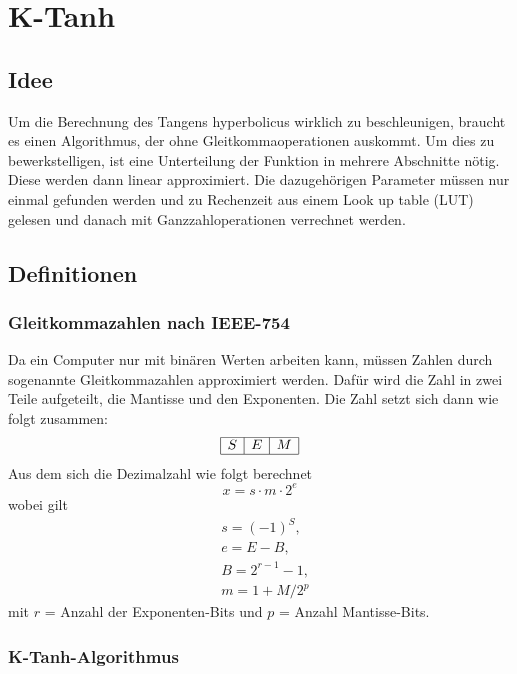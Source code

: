%
%
%
\section{K-Tanh
\label{transfer:section:teil4}}

\subsection{Idee
	\label{transfer:subsection:Ktanh-Idee}}
Um die Berechnung des Tangens hyperbolicus wirklich zu beschleunigen, braucht es einen Algorithmus, der ohne Gleitkommaoperationen auskommt. Um dies zu bewerkstelligen, ist eine Unterteilung der Funktion in mehrere Abschnitte nötig. Diese werden dann linear approximiert. Die dazugehörigen Parameter müssen nur einmal gefunden werden und zu Rechenzeit aus einem Look up table (LUT) gelesen und danach mit Ganzzahloperationen verrechnet werden.


\subsection{Definitionen
	\label{transfer:subsection:Ktanh-Definition}}

\subsubsection{Gleitkommazahlen nach IEEE-754
	\label{transfer:subsection:Ktanh-Algorithmus:Gleitkommazahl}}
Da ein Computer nur mit binären Werten arbeiten kann, müssen Zahlen durch sogenannte Gleitkommazahlen approximiert werden. Dafür wird die Zahl in zwei Teile aufgeteilt, die Mantisse und den Exponenten. Die Zahl setzt sich dann wie folgt zusammen:
$$
\begin{array}{|l|l|l|}
	\hline S & E & M \\
	\hline
\end{array}
$$
Aus dem sich die Dezimalzahl wie folgt berechnet
$$
x=s \cdot m \cdot 2^{e}
$$
wobei gilt
$$
\begin{aligned}
	&s=(-1)^{S}, \\
	&e=E-B,\\
	&B=2^{r-1}-1,\\
	&m=1+M / 2^{p}
\end{aligned}
$$
mit $r$ = Anzahl der Exponenten-Bits und $p$ = Anzahl Mantisse-Bits.


\subsubsection{K-Tanh-Algorithmus
\label{transfer:subsection:Ktanh-Algorithmus}}


